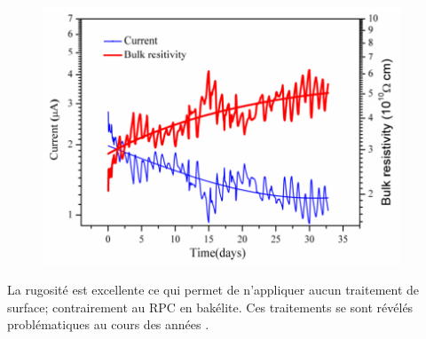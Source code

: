 \begin{figure}[ht!]
	\centering
	\includegraphics[width=0.95\textwidth]{GLA/resi.png}
	\label{resi}
\end{figure}

La rugosité est excellente ce qui permet de n'appliquer aucun traitement de surface; contrairement au RPC en bakélite. Ces traitements se sont révélés problématiques au cours des années \cite{1352718}.


